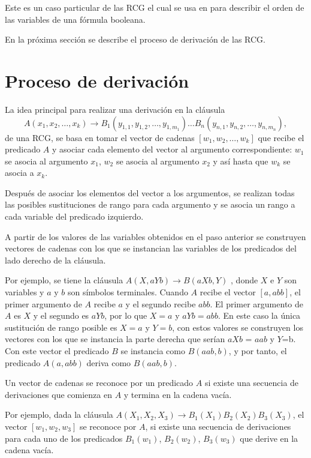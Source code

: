Este es un caso particular de las RCG el cual se usa en \cite{aSRCSAT} para describir el orden de las variables de una fórmula booleana. 

En la próxima sección se describe el proceso de derivación de las RCG.

\section{Proceso de derivación}

La idea principal para realizar una derivación en la cláusula 
\[
    A(x_1, x_2, \ldots, x_k) \to B_1(y_{1,1}, y_{1,2}, \ldots, y_{1,m_1}) \ldots B_n(y_{n,1}, y_{n,2}, \ldots, y_{n,m_n}),
\]
de una RCG, se basa en tomar el vector de cadenas $[w_1, w_2,\ldots, w_k]$ que recibe el predicado $A$ y asociar cada elemento del vector al argumento 
correspondiente: $w_1$ se asocia al argumento $x_1$, $w_2$ se asocia al argumento $x_2$ y así hasta que 
$w_k$ se asocia a $x_k$. 

Después de asociar los elementos del vector a los argumentos, se realizan todas las posibles sustituciones de rango para cada argumento y se asocia un rango a 
cada variable del predicado izquierdo.

A partir de los valores de las variables obtenidos en el paso anterior se construyen vectores de cadenas con los que se 
instancian las variables de los predicados del lado derecho de la cláusula.

Por ejemplo, se tiene la cláusula $A(X,aYb)\to B(aXb,Y)$ , donde $X$ e $Y$ son variables y $a$ y $b$ son símbolos 
terminales. Cuando $A$ recibe el vector $[a,abb]$, el primer argumento de $A$ recibe $a$ y el segundo recibe $abb$. 
El primer argumento de $A$ es $X$ y el segundo es $aYb$, por lo que $X=a$ y $aYb=abb$. En este caso la única sustitución 
de rango posible es  $X=a$ y $Y=b$, con estos valores se construyen los vectores con los que se instancia la parte derecha 
que serían $aXb$ = $aab$ y $Y$=b. Con este vector el predicado $B$ se instancia como $B(aab,b)$, y por tanto, 
el predicado $A(a,abb)$ deriva como $B(aab,b)$.


Un vector de cadenas se reconoce por un predicado $A$ si existe una secuencia de derivaciones que comienza en $A$ y termina en la cadena vacía.

Por ejemplo, dada la cláusula $A(X_1,X_2,X_3)\to B_1(X_1)B_2(X_2)B_3(X_3)$, el vector $[w_1,w_2,w_3]$ se reconoce por $A$, si existe una secuencia de derivaciones para cada uno de los predicados $B_1(w_1)$, $B_2(w_2)$, $B_3(w_3)$ que derive en la cadena vacía.

